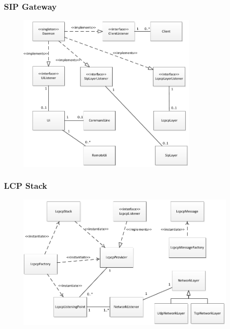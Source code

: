 \documentclass[10pt, xcolor=pdflatex, dvipsnames, table]{beamer}
\begin{document}

\frame[plain]{\bluepage{}}


\begin{frame}
\frametitle{SIP Gateway}
\begin{figure}[H]
  \centering
      \includegraphics[width=9cm,keepaspectratio]{fig/sipgw.pdf}
  \label{fig:comp}
\end{figure}
\end{frame}


\begin{frame}
\frametitle{LCP Stack}
\begin{figure}[H]
  \centering
      \includegraphics[width=11cm,keepaspectratio]{fig/lcpstack.pdf}
  \label{fig:comp}
\end{figure}
\end{frame}
\end{document}
